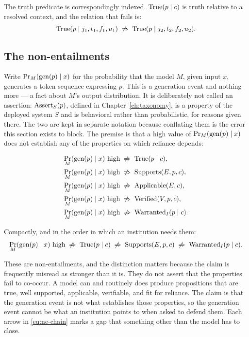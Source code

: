 The truth predicate is correspondingly indexed. $\operatorname{True}(p \mid c)$ is truth relative
to a resolved context, and the relation that fails is:
\begin{equation}
  \operatorname{True}(p \mid j_1, t_1, f_1, u_1)
  \;\not\Rightarrow\;
  \operatorname{True}(p \mid j_2, t_2, f_2, u_2).
  \label{eq:no-transfer}
\end{equation}

\subsection{The non-entailments}

Write $\Pr_M(\operatorname{gen}(p) \mid x)$ for the probability that the model $M$, given input
$x$, generates a token sequence expressing $p$. This is a generation event and nothing
more --- a fact about $M$'s output distribution. It is deliberately not called an
assertion: $\operatorname{Assert}_S(p)$, defined in Chapter~\ref{ch:taxonomy}, is a property of the
deployed system $S$ and is behavioral rather than probabilistic, for reasons given
there. The two are kept in separate notation because conflating them is the error this
section exists to block. The premise is that a high value of $\Pr_M(\operatorname{gen}(p) \mid x)$
does not establish any of the properties on which reliance depends:

\begin{align}
  \Pr_M(\operatorname{gen}(p) \mid x) \text{ high}
    &\;\not\Rightarrow\; \operatorname{True}(p \mid c),            \label{eq:ne-true}\\
  \Pr_M(\operatorname{gen}(p) \mid x) \text{ high}
    &\;\not\Rightarrow\; \operatorname{Supports}(E, p, c),         \label{eq:ne-supported}\\
  \Pr_M(\operatorname{gen}(p) \mid x) \text{ high}
    &\;\not\Rightarrow\; \operatorname{Applicable}(E, c),          \label{eq:ne-applicable}\\
  \Pr_M(\operatorname{gen}(p) \mid x) \text{ high}
    &\;\not\Rightarrow\; \operatorname{Verified}(V, p, c),         \label{eq:ne-verified}\\
  \Pr_M(\operatorname{gen}(p) \mid x) \text{ high}
    &\;\not\Rightarrow\; \operatorname{Warranted}_I(p \mid c).     \label{eq:ne-warranted}
\end{align}

Compactly, and in the order in which an institution needs them:
\begin{equation}
  \Pr_M(\operatorname{gen}(p) \mid x) \text{ high}
  \;\not\Rightarrow\; \operatorname{True}(p \mid c)
  \;\not\Rightarrow\; \operatorname{Supports}(E, p, c)
  \;\not\Rightarrow\; \operatorname{Warranted}_I(p \mid c).
  \label{eq:ne-chain}
\end{equation}

These are non-entailments, and the distinction matters because the claim is
frequently misread as stronger than it is. They do not assert that the properties
fail to co-occur. A model can and routinely does produce propositions that are
true, well supported, applicable, verifiable, and fit for reliance. The claim is
that the generation event is not what establishes those properties, so the
generation event cannot be what an institution points to when asked to defend
them. Each arrow in \eqref{eq:ne-chain} marks a gap that something other than the
model has to close.

